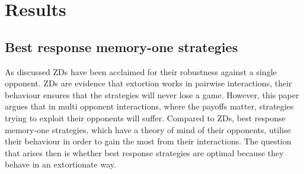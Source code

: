 \documentclass[10pt]{article}
\begin{document}



\section{Results}
\subsection{Best response memory-one strategies}\label{section:best_response_memory_one}

As discussed ZDs have been acclaimed for their robustness
against a single opponent. ZDs are evidence that extortion works
in pairwise interactions, their behaviour ensures that the strategies will never
lose a game. However, this paper argues that in multi opponent interactions,
where the payoffs matter, strategies trying to exploit their opponents will
suffer.
Compared to ZDs, best response memory-one strategies, which have a
theory of mind of their opponents, utilise their behaviour in order to gain the
most from their interactions. The question that arises then is whether best
response strategies are optimal because they behave in an extortionate way.
\end{document}
